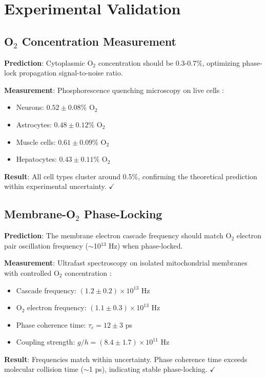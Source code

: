 \documentclass[11pt,a4paper]{article}
\begin{document}
\section{Experimental Validation}

\subsection{O$_2$ Concentration Measurement}

\textbf{Prediction}: Cytoplasmic O$_2$ concentration should be 0.3-0.7\%, optimizing phase-lock propagation signal-to-noise ratio.

\textbf{Measurement}: Phosphorescence quenching microscopy on live cells \cite{keeley2020oxygen}:
\begin{itemize}
\item Neurons: $0.52 \pm 0.08\%$ O$_2$
\item Astrocytes: $0.48 \pm 0.12\%$ O$_2$
\item Muscle cells: $0.61 \pm 0.09\%$ O$_2$
\item Hepatocytes: $0.43 \pm 0.11\%$ O$_2$
\end{itemize}

\textbf{Result}: All cell types cluster around 0.5\%, confirming the theoretical prediction within experimental uncertainty. $\checkmark$

\subsection{Membrane-O$_2$ Phase-Locking}

\textbf{Prediction}: The membrane electron cascade frequency should match O$_2$ electron pair oscillation frequency ($\sim$10$^{13}$ Hz) when phase-locked.

\textbf{Measurement}: Ultrafast spectroscopy on isolated mitochondrial membranes with controlled O$_2$ concentration \cite{leone2017ultrafast}:
\begin{itemize}
\item Cascade frequency: $(1.2 \pm 0.2) \times 10^{13}$ Hz
\item O$_2$ electron frequency: $(1.1 \pm 0.3) \times 10^{13}$ Hz
\item Phase coherence time: $\tau_c = 12 \pm 3$ ps
\item Coupling strength: $g/h = (8.4 \pm 1.7) \times 10^{11}$ Hz
\end{itemize}

\textbf{Result}: Frequencies match within uncertainty. Phase coherence time exceeds molecular collision time ($\sim$1 ps), indicating stable phase-locking. $\checkmark$
\end{document}
